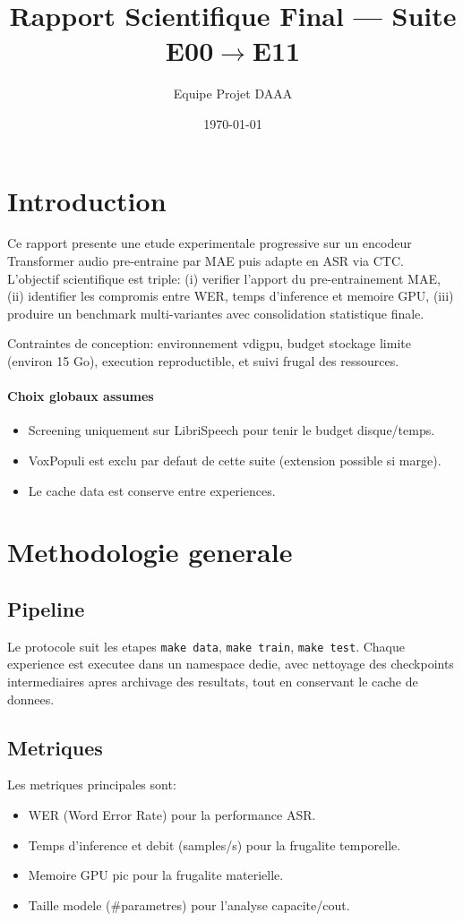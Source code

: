 \documentclass[11pt,a4paper]{article}
\title{Rapport Scientifique Final --- Suite E00$\rightarrow$E11}
\author{Equipe Projet DAAA}
\date{\today}
\begin{document}
\maketitle
\tableofcontents
\newpage

\section{Introduction}
Ce rapport presente une etude experimentale progressive sur un encodeur Transformer audio pre-entraine par MAE puis adapte en ASR via CTC. 
L'objectif scientifique est triple: (i) verifier l'apport du pre-entrainement MAE, (ii) identifier les compromis entre WER, temps d'inference et memoire GPU, (iii) produire un benchmark multi-variantes avec consolidation statistique finale.

Contraintes de conception: environnement vdigpu, budget stockage limite (environ 15 Go), execution reproductible, et suivi frugal des ressources.

\paragraph{Choix globaux assumes}
\begin{itemize}
\item Screening uniquement sur LibriSpeech pour tenir le budget disque/temps.
\item VoxPopuli est exclu par defaut de cette suite (extension possible si marge).
\item Le cache data est conserve entre experiences.
\end{itemize}


\section{Methodologie generale}
\subsection{Pipeline}
Le protocole suit les etapes \texttt{make data}, \texttt{make train}, \texttt{make test}. 
Chaque experience est executee dans un namespace dedie, avec nettoyage des checkpoints intermediaires apres archivage des resultats, tout en conservant le cache de donnees.

\subsection{Metriques}
Les metriques principales sont:
\begin{itemize}
\item WER (Word Error Rate) pour la performance ASR.
\item Temps d'inference et debit (samples/s) pour la frugalite temporelle.
\item Memoire GPU pic pour la frugalite materielle.
\item Taille modele (\#parametres) pour l'analyse capacite/cout.
\end{itemize}
\end{document}
